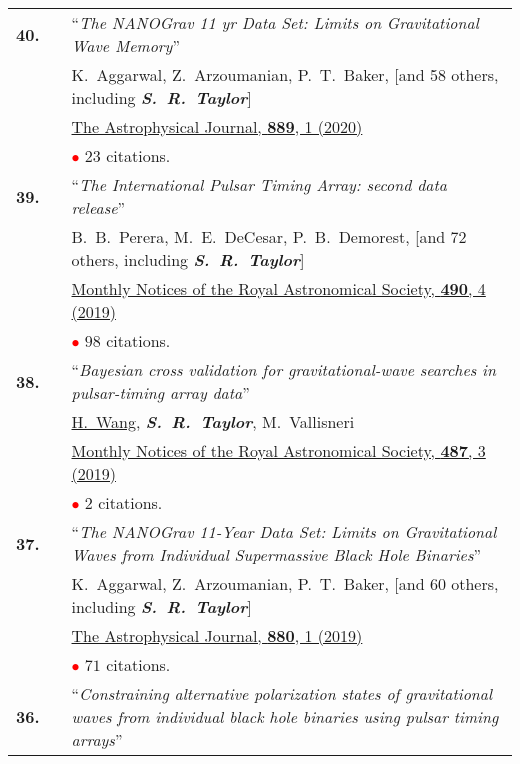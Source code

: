 \documentclass[11pt,letterpaper,sans]{moderncv}
\begin{document}
{\begin{longtable}{rp{0.3cm}p{15.8cm}}
\textbf{40.} & & ``\textit{The NANOGrav 11 yr Data Set: Limits on Gravitational Wave Memory}'' \\ 
&&K.~Aggarwal, Z.~Arzoumanian, P.~T.~Baker, [and 58 others, including \textit{\textbf{S.~R.~Taylor}}] \\
&& \href{https://iopscience.iop.org/article/10.3847/1538-4357/ab6083}{{\color{color1} The Astrophysical Journal, \textbf{889}, 1 (2020)}} \\
&& \textcolor{red}{$\bullet$} $23$ citations. \vspace{0.09cm}\\
\textbf{39.} & & ``\textit{The International Pulsar Timing Array: second data release}'' \\ 
&&B.~B.~Perera, M.~E.~DeCesar, P.~B.~Demorest, [and 72 others, including \textit{\textbf{S.~R.~Taylor}}] \\
&& \href{https://academic.oup.com/mnras/article-abstract/490/4/4666/5586597?redirectedFrom=fulltext}{{\color{color1} Monthly Notices of the Royal Astronomical Society, \textbf{490}, 4 (2019)}} \\
&& \textcolor{red}{$\bullet$} $98$ citations. \vspace{0.09cm}\\
\textbf{38.} & & ``\textit{Bayesian cross validation for gravitational-wave searches in pulsar-timing array data}'' \\ 
&&\underline{H.~Wang}, \textit{\textbf{S.~R.~Taylor}}, M.~Vallisneri \\
&& \href{https://academic.oup.com/mnras/article/487/3/3644/5511287}{{\color{color1} Monthly Notices of the Royal Astronomical Society, \textbf{487}, 3 (2019)}} \\
&& \textcolor{red}{$\bullet$} $2$ citations. \vspace{0.09cm}\\
\textbf{37.} & & ``\textit{The NANOGrav 11-Year Data Set: Limits on Gravitational Waves from Individual Supermassive Black Hole Binaries}'' \\ 
&&K.~Aggarwal, Z.~Arzoumanian, P.~T.~Baker, [and 60 others, including \textit{\textbf{S.~R.~Taylor}}] \\
&& \href{https://iopscience.iop.org/article/10.3847/1538-4357/ab2236}{{\color{color1} The Astrophysical Journal, \textbf{880}, 1 (2019)}} \\
&& \textcolor{red}{$\bullet$} $71$ citations. \vspace{0.09cm}\\
\textbf{36.} & & ``\textit{Constraining alternative polarization states of gravitational waves from individual black hole binaries using pulsar timing arrays}'' \\ 

\end{longtable}}
\end{document}
